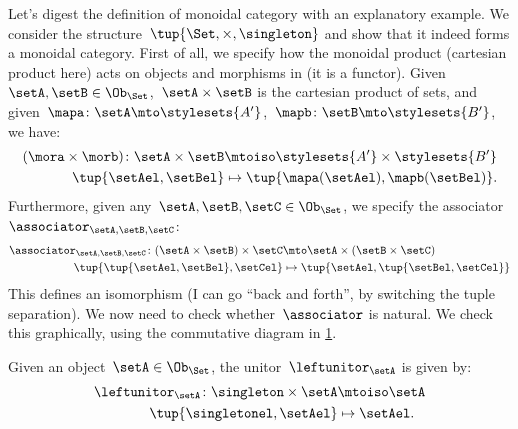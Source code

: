 \begin{example}
    Let's digest the definition of monoidal category with an explanatory example.
    We consider the structure~$\tup{\Set,\times,\singleton}$ and show that it indeed forms a monoidal category.
    First of all, we specify how the monoidal product (cartesian product here) acts on objects and morphisms in \Set (it is a functor).
    Given~$\setA,\setB\in \Ob_{\Set}$,~$\setA\times \setB$ is the cartesian product of sets, and given~$\mapa\colon \setA\mto \stylesets{A'}$,~$\mapb\colon \setB\mto \stylesets{B'}$, we have:
    \begin{equation*}
        \label{eq:set_mon_prod_2}
        \begin{aligned}
        (\mora \times \morb)
            \colon \setA\times \setB&\mtoiso \stylesets{A'}\times \stylesets{B'}\\
            \tup{\setAel,\setBel}&\mapsto \tup{\mapa(\setAel),\mapb(\setBel)}.
        \end{aligned}
    \end{equation*}
    Furthermore, given any~$\setA,\setB,\setC\in \Ob_{\Set}$, we specify the associator~$\associator_{\setA,\setB,\setC}$:
    \begin{equation*}
        \label{eq:set_mon_prod_3}
        \begin{aligned}
            \associator_{\setA,\setB,\setC}\colon (\setA\times \setB)\times \setC&\mto \setA\times (\setB\times \setC)\\
            \tup{\tup{\setAel,\setBel},\setCel}&\mapsto \tup{\setAel,\tup{\setBel,\setCel}}
        \end{aligned}
    \end{equation*}
    This defines an isomorphism (I can go ``back and forth'', by switching the tuple separation).
    We now need to check whether~$\associator$ is natural.
    We check this graphically, using the commutative diagram in \cref{fig:monoidal_set_ass_nat}.

    \begin{figure}[h!]
        \centering
        \caption{}
        \label{fig:monoidal_set_ass_nat}
    \end{figure}

    Given an object~$\setA\in \Ob_\Set$, the unitor~$\leftunitor_\setA$ is given by:
    \begin{equation*}
        \label{eq:set_mon_prod_4}
        \begin{aligned}
            \leftunitor_\setA\colon \singleton \times \setA &\mtoiso \setA\\
            \tup{\singletonel,\setAel}&\mapsto \setAel.
        \end{aligned}
    \end{equation*}


\end{example}
